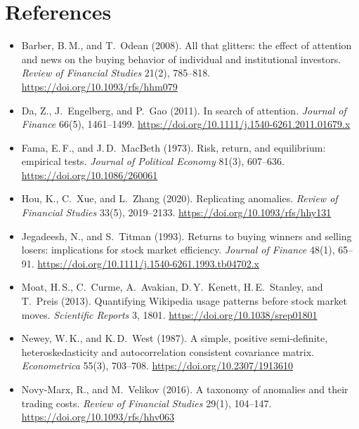 \documentclass[11pt,a4paper]{article}
\begin{document}
\section*{References}
\small
\begin{itemize}[leftmargin=*,label={}]
  \item \hypertarget{ref:barber2008}{}Barber, B.\,M., and T.\ Odean (2008). All that glitters: the effect of
        attention and news on the buying behavior of individual and institutional investors.
        \textit{Review of Financial Studies} 21(2), 785--818. \newline\url{https://doi.org/10.1093/rfs/hhm079}
  \item \hypertarget{ref:da2011}{}Da, Z., J.\ Engelberg, and P.\ Gao (2011). In search of attention.
        \textit{Journal of Finance} 66(5), 1461--1499. \newline\url{https://doi.org/10.1111/j.1540-6261.2011.01679.x}
  \item \hypertarget{ref:fama1973}{}Fama, E.\,F., and J.\,D.\ MacBeth (1973). Risk, return, and equilibrium:
        empirical tests. \textit{Journal of Political Economy} 81(3), 607--636.
        \newline\url{https://doi.org/10.1086/260061}
  \item \hypertarget{ref:hou2020}{}Hou, K., C.\ Xue, and L.\ Zhang (2020). Replicating anomalies.
        \textit{Review of Financial Studies} 33(5), 2019--2133. \newline\url{https://doi.org/10.1093/rfs/hhy131}
  \item \hypertarget{ref:jegadeesh1993}{}Jegadeesh, N., and S.\ Titman (1993). Returns to buying winners
        and selling losers: implications for stock market efficiency. \textit{Journal of Finance}
        48(1), 65--91. \newline\url{https://doi.org/10.1111/j.1540-6261.1993.tb04702.x}
  \item \hypertarget{ref:moat2013}{}Moat, H.\,S., C.\ Curme, A.\ Avakian, D.\,Y.\ Kenett, H.\,E.\ Stanley, and
        T.\ Preis (2013). Quantifying Wikipedia usage patterns before stock market moves.
        \textit{Scientific Reports} 3, 1801. \newline\url{https://doi.org/10.1038/srep01801}
  \item \hypertarget{ref:newey1987}{}Newey, W.\,K., and K.\,D.\ West (1987). A simple, positive semi-definite,
        heteroskedasticity and autocorrelation consistent covariance matrix. \textit{Econometrica}
        55(3), 703--708. \newline\url{https://doi.org/10.2307/1913610}
  \item \hypertarget{ref:novymarx2016}{}Novy-Marx, R., and M.\ Velikov (2016). A taxonomy of anomalies and
        their trading costs. \textit{Review of Financial Studies} 29(1), 104--147.
        \newline\url{https://doi.org/10.1093/rfs/hhv063}
\end{itemize}
\normalsize
\end{document}
